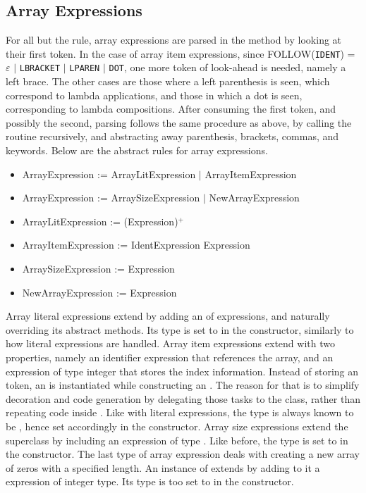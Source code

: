 \subsection{Array Expressions}

For all but the  rule, array expressions are parsed in the  method by looking at their first token. In the case of array item expressions, since FOLLOW(\texttt{IDENT}) = $\varepsilon$ $|$ \texttt{LBRACKET} $|$ \texttt{LPAREN} $|$ \texttt{DOT}, one more token of look-ahead is needed, namely a left brace. The other cases are those where a left parenthesis is seen, which correspond to lambda applications, and those in which a dot is seen, corresponding to lambda compositions. After consuming the first token, and possibly the second, parsing follows the same procedure as above, by calling the  routine recursively, and abstracting away parenthesis, brackets, commas, and keywords. Below are the abstract rules for array expressions.

\begin{itemize}
	\item ArrayExpression := ArrayLitExpression $|$ ArrayItemExpression
	\item ArrayExpression := ArraySizeExpression $|$ NewArrayExpression
	\item ArrayLitExpression := (Expression)$^+$
	\item ArrayItemExpression := IdentExpression Expression
	\item ArraySizeExpression := Expression
	\item NewArrayExpression := Expression
\end{itemize}

Array literal expressions extend  by adding an  of expressions, and naturally overriding its abstract methods. Its type is set to  in the constructor, similarly to how literal expressions are handled. Array item expressions extend  with two properties, namely an identifier expression that references the array, and an expression of type integer that stores the index information. Instead of storing an  token, an  is instantiated while constructing an . The reason for that is to simplify decoration and code generation by delegating those tasks to the  class, rather than repeating code inside . Like with literal expressions, the type is always known to be , hence set accordingly in the constructor. Array size expressions extend the superclass by including an expression of type . Like before, the type is set to  in the constructor. The last type of array expression deals with creating a new array of zeros with a specified length. An instance of  extends  by adding to it a  expression of integer type. Its type is too set to  in the constructor.

